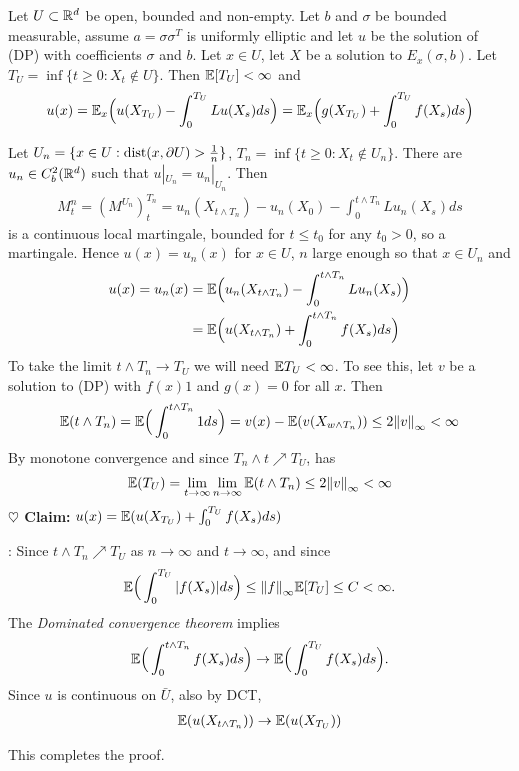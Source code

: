 \documentclass[12pt,a4paper]{article}
\newenvironment{proof}
{\begin{changemargin}{0.5cm}{0.5cm} 
	}%
	{\end{changemargin}
}
\newenvironment{subproof}
{\begin{changemargin}{0.5cm}{0.5cm} 
	}%
	{\end{changemargin}
}
\newenvironment{p}
{\begin{proof} 
	}%
	{\end{proof}
}
\begin{document}
\thm Let $U \subset \mathbb{R}^d$ be open, bounded and non-empty. Let $b$ and $\sigma$ be bounded measurable, assume $a = \sigma \sigma^T$ is uniformly elliptic and let $u$ be the solution of (DP) with coefficients $\sigma$ and $b$. Let $x\in U$, let $X$ be a solution to $E_x(\sigma, b)$. Let $T_U = \inf\{t\geq 0 : X_t \not\in U\}$. Then $\mathbb{E} [ T_U ] < \infty$ and
\begin{align*}
u(x) = \mathbb{E}_x \Big( u(X_{T_U}) - \int_{0}^{T_U} Lu(X_s) ds \Big) = \mathbb{E}_x \Big( g(X_{T_U}) + \int_0^{T_U} f(X_s) ds  \Big)
\end{align*}
\begin{p}
\pf Let $U_n = \{x\in U : \text{dist}(x, \partial U) > \frac{1}{n}\}$, $T_n = \inf \{t\geq 0 : X_t \not\in U_n \}$. There are $u_n \in C_b^2(\mathbb{R}^d)$ such that $u|_{U_n} = u_n|_{U_n}$. Then
\begin{align*}
M_t^n = (M^{U_n})_t^{T_n} = u_n(X_{t\wedge T_n}) - u_n(X_0) - \int_0^{t\wedge T_n} Lu_n(X_s) ds
\end{align*}
is a continuous local martingale, bounded for $t\leq t_0$ for any $t_0 >0$, so a martingale. Hence $u(x) = u_n (x)$ for $x\in U$, $n$ large enough so that $x\in U_n$ and
\begin{align*}
u(x) = u_n(x) & = \mathbb{E} \Big( u_n(X_{t\wedge T_n}) - \int_0^{t\wedge T_n} Lu_n(X_s) \Big) \\
&= \mathbb{E} \Big( u(X_{t\wedge T_n}) + \int_0^{t\wedge T_n} f(X_s) ds \Big)
\end{align*}
To take the limit $t\wedge T_n \rightarrow T_U$ we will need $\mathbb{E} T_U < \infty$. To see this, let $v$ be a solution to (DP) with $f(x) 1$ and $g(x) = 0$ for all $x$. Then
\begin{align*}
\avg (t\wedge T_n) = \avg \Big( \int_0^{t\wedge T_n} 1 ds \Big) = v(x) - \avg (v(X_{w\wedge T_n})) \leq 2\snorms{v}{\infty} < \infty
\end{align*}
By monotone convergence and since $T_n\wedge t \nearrow T_U$, has
\begin{align*}
\avg (T_U) = \lim_{t\rightarrow \infty} \lim_{n\rightarrow \infty} \avg(t\wedge T_n) \leq 2\snorms{v}{\infty} < \infty
\end{align*}
\textbf{$\heartsuit$ Claim:} $u(x) = \mathbb{E} (u(X_{T_U}) + \int_0^{T_U} f(X_s) ds)$
\begin{subproof}: Since $t\wedge T_n \nearrow T_U$ as $n\rightarrow \infty$ and $t\rightarrow \infty$, and since
\begin{align*}
\avg \Big( \int_0^{T_U} |f(X_s)|ds  \Big) \leq \snorms{f}{\infty} \avg [T_U] \leq C < \infty.
\end{align*}
The \emph{Dominated convergence theorem} implies
\begin{align*}
\mathbb{E} \Big( \int_0^{t\wedge T_n} f(X_s) ds \Big) \rightarrow \mathbb{E} \Big( \int_0^{T_U} f(X_s) ds\Big).
\end{align*}
Since $u$ is continuous on $\bar{U}$, also by DCT,
\begin{align*}
\mathbb{E} (u(X_{t\wedge T_n})) \rightarrow \mathbb{E} (u(X_{T_U}))
\end{align*}
\end{subproof}
This completes the proof.

\eop
\end{p}
\s
\end{document}
